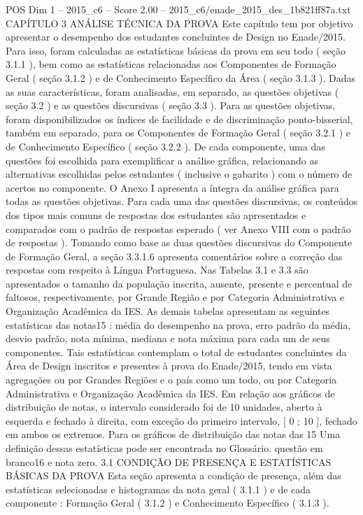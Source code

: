 \begin{textsample}{POS Dim 1 – 2015\_c6 – Score 2.00 – 2015\_c6/enade\_2015\_des\_1b821ff87a.txt}  \label{ex:f1_pos_153}
CAPÍTULO 3 ANÁLISE TÉCNICA DA PROVA Este capítulo tem por objetivo apresentar o desempenho dos estudantes concluintes de Design no Enade/2015.
Para isso, foram calculadas as estatísticas básicas da prova em seu todo ( seção 3.1.1 ), bem como as estatísticas relacionadas aos Componentes de Formação Geral ( seção 3.1.2 ) e de Conhecimento Específico da Área ( seção 3.1.3 ).
Dadas as suas características, foram analisadas, em separado, as questões objetivas ( seção 3.2 ) e as questões discursivas ( seção 3.3 ).
Para as questões objetivas, foram disponibilizados os índices de facilidade e de discriminação ponto-bisserial, também em separado, para os Componentes de Formação Geral ( seção 3.2.1 ) e de Conhecimento Específico ( seção 3.2.2 ).
De cada componente, uma das questões foi escolhida para exemplificar a análise gráfica, relacionando as alternativas escolhidas pelos estudantes ( inclusive o gabarito ) com o número de acertos no componente.
O Anexo I apresenta a íntegra da análise gráfica para todas as questões objetivas.
Para cada uma das questões discursivas, os conteúdos dos tipos mais comuns de respostas dos estudantes são apresentados e comparados com o padrão de respostas esperado ( ver Anexo VIII com o padrão de respostas ).
Tomando como base as duas questões discursivas do Componente de Formação Geral, a seção 3.3.1.6 apresenta comentários sobre a correção das respostas com respeito à Língua Portuguesa.
Nas Tabelas 3.1 e 3.3 são apresentados o tamanho da população inscrita, ausente, presente e percentual de faltosos, respectivamente, por Grande Região e por Categoria Administrativa e Organização Acadêmica da IES.
As demais tabelas apresentam as seguintes estatísticas das notas15 : média do desempenho na prova, erro padrão da média, desvio padrão, nota mínima, mediana e nota máxima para cada um de seus componentes.
Tais estatísticas contemplam o total de estudantes concluintes da Área de Design inscritos e presentes à prova do Enade/2015, tendo em vista agregações ou por Grandes Regiões e o país como um todo, ou por Categoria Administrativa e Organização Acadêmica da IES.
Em relação aos gráficos de distribuição de notas, o intervalo considerado foi de 10 unidades, aberto à esquerda e fechado à direita, com exceção do primeiro intervalo, [ 0 ; 10 ], fechado em ambos os extremos.
Para os gráficos de distribuição das notas das 15 Uma definição dessas estatísticas pode ser encontrada no Glossário. questão em branco16 e nota zero. 3.1 CONDIÇÃO DE PRESENÇA E ESTATÍSTICAS BÁSICAS DA PROVA Esta seção apresenta a condição de presença, além das estatísticas selecionadas e histogramas da nota geral ( 3.1.1 ) e de cada componente : Formação Geral ( 3.1.2 ) e Conhecimento Específico ( 3.1.3 ).

\end{textsample}
